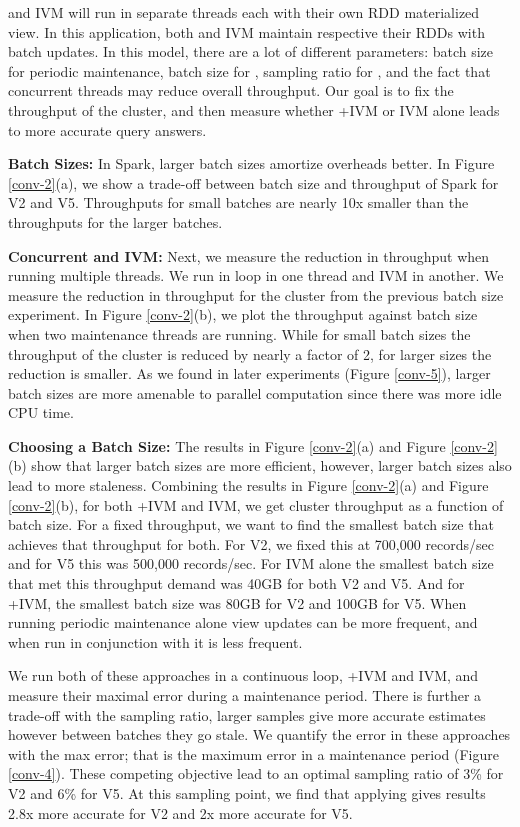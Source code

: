 \svc and IVM will run in separate threads each with their own RDD materialized view.
In this application, both \svc and IVM maintain respective their RDDs with batch updates.
In this model, there are a lot of different parameters: batch size for periodic maintenance, batch size for \svc, sampling ratio for \svc, and the fact that concurrent threads may reduce overall throughput.
Our goal is to fix the throughput of the cluster, and then measure whether \svcnospace+IVM or IVM alone leads to more accurate query answers.

\textbf{Batch Sizes:} In Spark, larger batch sizes amortize overheads better.
In Figure \ref{conv-2}(a), we show a trade-off between batch size and throughput of Spark for V2 and V5.
Throughputs for small batches are nearly 10x smaller than the throughputs for the larger batches. 

\textbf{Concurrent \svc and IVM:} Next, we measure the reduction in throughput when running multiple threads.
We run  in loop in one thread and IVM in another.
We measure the reduction in throughput for the cluster from the previous batch size experiment.
In Figure \ref{conv-2}(b), we plot the throughput against batch size when two maintenance threads are running.
While for small batch sizes the throughput of the cluster is reduced by nearly a factor of 2, for larger sizes the reduction is
smaller.
As we found in later experiments (Figure \ref{conv-5}), larger batch sizes are more amenable to parallel computation since there was more idle CPU time.

\textbf{Choosing a Batch Size:}
The results in Figure \ref{conv-2}(a) and Figure \ref{conv-2}(b) show that larger batch sizes are more efficient, however, larger batch sizes also lead to more staleness.
Combining the results in Figure \ref{conv-2}(a) and Figure \ref{conv-2}(b), for both \svcnospace+IVM and IVM, we get cluster throughput as a function of batch size.
For a fixed throughput, we want to find the smallest batch size that achieves that throughput for both.
For V2, we fixed this at 700,000 records/sec and for V5 this was 500,000 records/sec.
For IVM alone the smallest batch size that met this throughput demand was 40GB for both V2 and V5.
And for \svcnospace+IVM, the smallest batch size was 80GB for V2 and 100GB for V5. 
When running periodic maintenance alone view updates can be more frequent, and when run in conjunction with \svc it is less frequent. 

We run both of these approaches in a continuous loop, \svcnospace+IVM and IVM, and measure their maximal error during a maintenance period.
There is further a trade-off with the sampling ratio, larger samples give more accurate estimates however between \svc batches they go stale.
We quantify the error in these approaches with the max error; that is the maximum error in a maintenance period (Figure \ref{conv-4}).
These competing objective lead to an optimal sampling ratio of 3\% for V2 and 6\% for V5.
At this sampling point, we find that applying \svc gives results 2.8x more accurate for V2 and 2x more accurate for V5.

